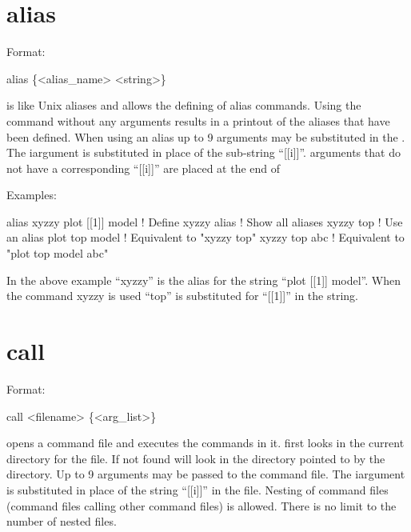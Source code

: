 \vfil
\break

\section{alias}
\label{s:alias}

Format: 
\begin{example}
  alias \{<alias_name> <string>\}
\end{example}

\vskip 0.2in

 is like Unix aliases and allows the defining of alias
commands. Using the  command without any arguments results
in a printout of the aliases that have been defined. When using an
alias up to 9 arguments may be substituted in the . The
i\Th argument is substituted in place of the sub-string ``[[i]]''.
arguments that do not have a corresponding ``[[i]]'' are placed at the end
of 

Examples:
\begin{example}
    alias xyzzy plot [[1]] model  ! Define xyzzy
    alias                         ! Show all aliases
    xyzzy top                     ! Use an alias
    plot top model                ! Equivalent to "xyzzy top"
    xyzzy top abc                 ! Equivalent to "plot top model abc"
\end{example}
In the above example ``xyzzy'' is the alias for the string ``plot [[1]]
model''.  When the command xyzzy is used ``top'' is substituted
for ``[[1]]'' in the string.

\section{call}
\label{s:call}

Format: 
\begin{example}
  call <filename> \{<arg_list>\}  \Strut
\end{example}

\vskip 0.2in 
 opens a command file and executes the commands
in it.  \tao first looks in the current directory for the file. If not
found \tao will look in the directory pointed to by the
 directory.  Up to 9 arguments may be passed to
the command file. The i\Th argument is substituted in place of the
string ``[[i]]'' in the file. Nesting of command files (command files
calling other command files) is allowed. There is no limit to the
number of nested files.

